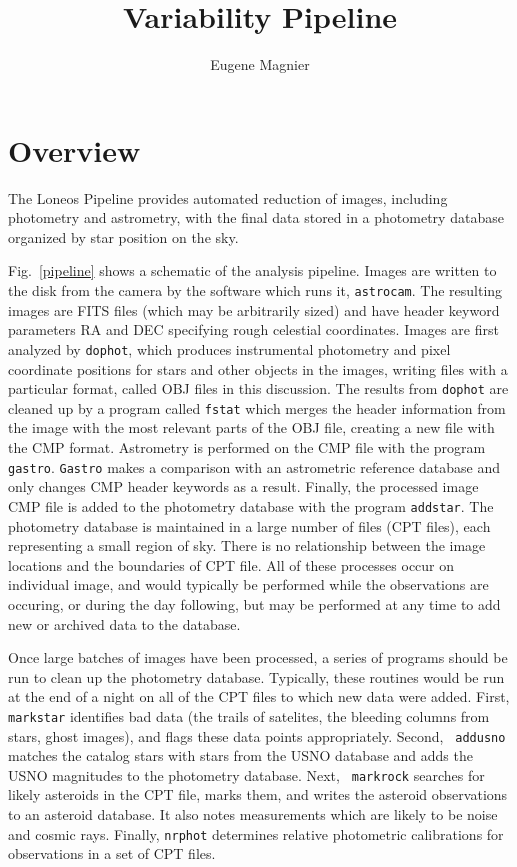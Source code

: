 \documentclass{article}
\title{Variability Pipeline}
\author{Eugene Magnier}
\begin{document}
\maketitle

\section{Overview}

The Loneos Pipeline provides automated reduction of images, including
photometry and astrometry, with the final data stored in a photometry
database organized by star position on the sky.

Fig.~\ref{pipeline} shows a schematic of the analysis pipeline.
Images are written to the disk from the camera by the software which
runs it, {\tt astrocam}.  The resulting images are FITS files (which
may be arbitrarily sized) and have header keyword parameters RA and
DEC specifying rough celestial coordinates.  Images are first analyzed
by {\tt dophot}, which produces instrumental photometry and pixel
coordinate positions for stars and other objects in the images,
writing files with a particular format, called OBJ files in this
discussion.  The results from {\tt dophot} are cleaned up by a program
called {\tt fstat} which merges the header information from the image
with the most relevant parts of the OBJ file, creating a new file with
the CMP format.  Astrometry is performed on the CMP file with the
program {\tt gastro}.  {\tt Gastro} makes a comparison with an
astrometric reference database and only changes CMP header keywords as
a result.  Finally, the processed image CMP file is added to the
photometry database with the program {\tt addstar}.  The photometry
database is maintained in a large number of files (CPT files), each
representing a small region of sky.  There is no relationship between
the image locations and the boundaries of CPT file.  All of these
processes occur on individual image, and would typically be performed
while the observations are occuring, or during the day following, but
may be performed at any time to add new or archived data to the
database.

Once large batches of images have been processed, a series of programs
should be run to clean up the photometry database.  Typically, these
routines would be run at the end of a night on all of the CPT files to
which new data were added.  First, {\tt markstar} identifies bad data
(the trails of satelites, the bleeding columns from stars, ghost
images), and flags these data points appropriately.  Second, {\tt
  addusno} matches the catalog stars with stars from the USNO database
and adds the USNO magnitudes to the photometry database.  Next, {\tt
  markrock} searches for likely asteroids in the CPT file, marks them,
and writes the asteroid observations to an asteroid database.  It also
notes measurements which are likely to be noise and cosmic rays.
Finally, {\tt nrphot} determines relative photometric calibrations for
observations in a set of CPT files.  
\end{document}
